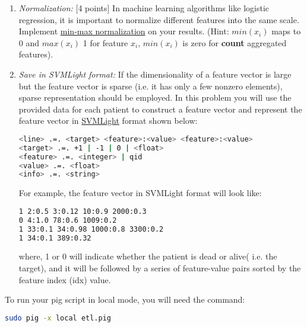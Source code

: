 \documentclass[12pt]{article}
\begin{document}
\begin{enumerate}
\begin{lstlisting}[frame=single]
(1, 1)
(0, 1)
(2, 2)
(3, 4)
\end{lstlisting}

\iffalse
\item \emph{Imputation:} [10 points]
Physicians order lab tests for patient on demand, thus we don't have average lab value as feature if patient don't have such test. This is a missing value problem. For a given feature, if its value is not missing from a few patients(more than 10 patients here in this problem), one can use average value of non-missing to replace missing, this is called the \href{http://missingdata.lshtm.ac.uk/index.php?option=com_content&view=article&id=68:simple-mean-imputation&catid=39:simple-ad-hoc-methods-for-coping-with-missing-data&Itemid=96}{Simple Mean Imputation}.
\fi

\item \emph{Normalization:} [4 points] In machine learning algorithms like logistic regression, it is important to normalize different features into the same scale. Implement \href{http://stats.stackexchange.com/questions/70801/how-to-normalize-data-to-0-1-range}{min-max normalization} on your results. (Hint: $min(x_i)$ maps to 0 and $max(x_i)$ 1 for feature $x_i$, $min(x_i)$ is zero for \textbf{count} aggregated features).

\item \emph{Save in  SVMLight format:} If the dimensionality of a feature vector is large but the feature vector is sparse (i.e. it has only a few nonzero elements), sparse representation should be employed. In this problem you will use the provided data for each patient to construct a feature vector and represent the feature vector in \href{http://svmlight.joachims.org/}{SVMLight} format shown below: \\

\begin{lstlisting}[frame=single, language=bash]
<line> .=. <target> <feature>:<value> <feature>:<value> 
<target> .=. +1 | -1 | 0 | <float> 
<feature> .=. <integer> | qid
<value> .=. <float>
<info> .=. <string>
\end{lstlisting}

For example, the feature vector in SVMLight format will look like: \\

\begin{lstlisting}[frame=single, language=bash]
1 2:0.5 3:0.12 10:0.9 2000:0.3
0 4:1.0 78:0.6 1009:0.2
1 33:0.1 34:0.98 1000:0.8 3300:0.2
1 34:0.1 389:0.32 
\end{lstlisting}

where, 1 or 0 will indicate whether the patient is dead or alive( i.e. the target), and it will be followed by a series of feature-value pairs sorted by the feature index (idx) value. 
\newline
\end{enumerate}
To run your pig script in local mode, you will need the command:  
\begin{lstlisting}[frame=single,language=bash]
sudo pig -x local etl.pig
\end{lstlisting}
\end{document}

